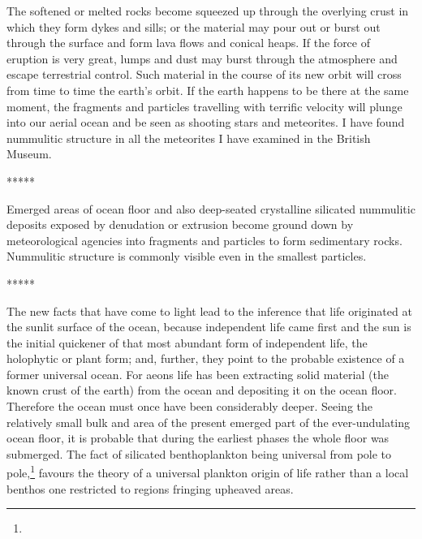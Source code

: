 \documentclass[a4paper, 12pt, oneside]{article}
\begin{document}
The softened or melted rocks become squeezed up through the overlying crust in which they form dykes and sills; or the material may pour out or burst out through the surface and form lava flows and conical heaps. If the force of eruption is very great, lumps and dust may burst through the atmosphere and escape terrestrial control. Such material in the course of its new orbit will cross from time to time the earth's orbit. If the earth happens to be there at the same moment, the fragments and particles travelling with terrific velocity will plunge into our aerial ocean and be seen as shooting stars and meteorites. I have found nummulitic structure in all the meteorites I have examined in the British Museum.

\centerline{*\hspace{15mm}*\hspace{15mm}*\hspace{15mm}*\hspace{15mm}*}
\bigskip

Emerged areas of ocean floor and also deep-seated crystalline silicated nummulitic deposits exposed by denudation or extrusion become ground down by meteorological agencies into fragments and particles to form sedimentary rocks. Nummulitic structure is commonly visible even in the smallest particles.

\centerline{*\hspace{15mm}*\hspace{15mm}*\hspace{15mm}*\hspace{15mm}*}
\bigskip

The new facts that have come to light lead to the inference that life originated at the sunlit surface of the ocean, because independent life came first and the sun is the initial quickener of that most abundant form of independent life, the holophytic or plant form; and, further, they point to the probable existence of a former universal ocean. For aeons life has been extracting solid material (the known crust of the earth) from the ocean and depositing it on the ocean floor. Therefore the ocean must once have been considerably deeper. Seeing the relatively small bulk and area of the present emerged part of the ever-undulating ocean floor, it is probable that during the earliest phases the whole floor was submerged. The fact of silicated benthoplankton being universal from pole to pole,\footnote{} favours the theory of a universal plankton origin of life rather than a local benthos one restricted to regions fringing upheaved areas.
\end{document}
